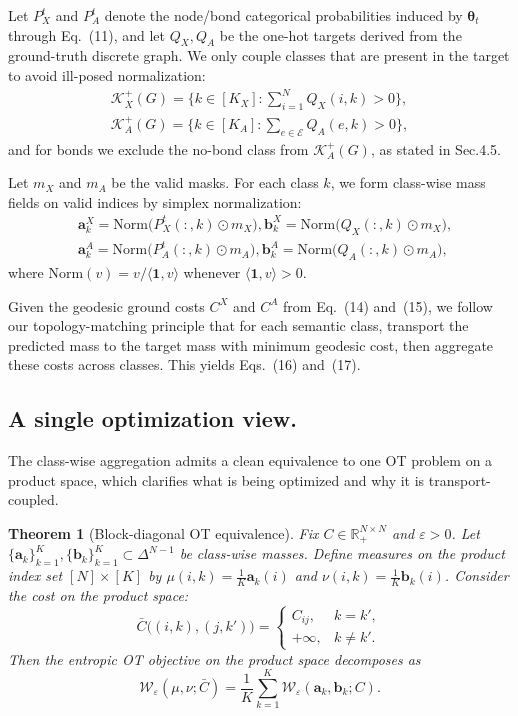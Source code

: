 \documentclass[journal,twoside,web]{ieeecolor}
\newtheorem{theorem}{Theorem}
\begin{document}
Let $P_X^{t}$ and $P_A^{t}$ denote the node/bond
categorical probabilities induced by $\boldsymbol{\theta}_t$ through Eq.~(11),
and let $Q_X,Q_A$ be the one-hot targets derived from the ground-truth discrete graph.
We only couple classes that are present in the target to avoid ill-posed normalization:
\begin{align}
\mathcal{K}_X^{+}(G)=\Big\{k\in[K_X]:\sum_{i=1}^{N} Q_X(i,k) > 0\Big\}, \\
\mathcal{K}_A^{+}(G)=\Big\{k\in[K_A]:\sum_{e\in\mathcal{E}} Q_A(e,k) > 0\Big\},
\end{align}
and for bonds we exclude the no-bond class from $\mathcal{K}_A^{+}(G)$, as stated in Sec.4.5.

Let $m_X$ and $m_A$ be the valid masks.
For each class $k$, we form class-wise mass fields on valid indices by simplex normalization:
\begin{align}
&\mathbf{a}_k^{X}=\mathrm{Norm}\!\big(P_X^{t}(:,k)\odot m_X\big),
\mathbf{b}_k^{X}=\mathrm{Norm}\!\big(Q_X(:,k)\odot m_X\big),
\\
&\mathbf{a}_k^{A}=\mathrm{Norm}\!\big(P_A^{t}(:,k)\odot m_A\big),
\mathbf{b}_k^{A}=\mathrm{Norm}\!\big(Q_A(:,k)\odot m_A\big),
\end{align}
where $\mathrm{Norm}(v)=v/\langle \mathbf{1},v\rangle$ whenever $\langle \mathbf{1},v\rangle>0$.

Given the geodesic ground costs $C^X$ and $C^A$ from Eq.~(14) and~(15), we follow our topology-matching principle that
for each semantic class, transport the predicted mass to the target mass with minimum geodesic cost,
then aggregate these costs across classes. This yields Eqs.~(16) and~(17).

\subsection{A single optimization view.} The class-wise aggregation admits a clean equivalence to one OT problem on a product space, which clarifies what is being optimized and why it is transport-coupled.

\begin{theorem}[Block-diagonal OT equivalence]
\label{thm:block_equiv}
Fix $C\in\mathbb{R}_+^{N \times N}$ and $\varepsilon>0$. Let $\{\mathbf{a}_k\}_{k=1}^{K},\{\mathbf{b}_k\}_{k=1}^{K}\subset \Delta^{N-1}$ be class-wise masses. Define measures on the product index set $[N]\times[K]$ by $\mu(i,k)=\frac{1}{K}\mathbf{a}_k(i)$ and $\nu(i,k)=\frac{1}{K}\mathbf{b}_k(i)$. Consider the cost on the product space:
\begin{equation}
\bar{C}\big((i,k),(j,k')\big)=
\begin{cases}
C_{ij}, & k=k',\\
+\infty, & k\neq k'.
\end{cases}
\end{equation}
Then the entropic OT objective on the product space decomposes as
\begin{equation}
\mathcal{W}_{\varepsilon}(\mu,\nu;\bar{C})
=
\frac{1}{K}\sum_{k=1}^{K}\mathcal{W}_{\varepsilon}(\mathbf{a}_k,\mathbf{b}_k;C).
\end{equation}
\end{theorem}
\end{document}

